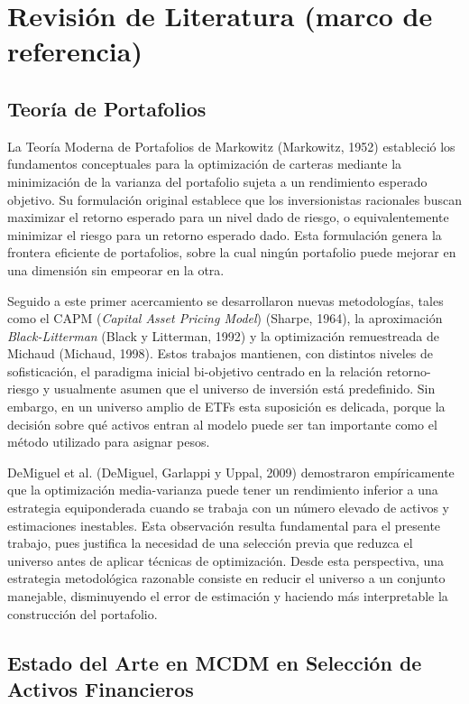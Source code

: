 \documentclass[12pt,letterpaper]{article}
\begin{document}
\clearpage
\section{Revisión de Literatura (marco de referencia)}

\subsection{Teoría de Portafolios}

La Teoría Moderna de Portafolios de Markowitz (Markowitz, 1952) estableció los fundamentos conceptuales para la optimización de carteras mediante la minimización de la varianza del portafolio sujeta a un rendimiento esperado objetivo. Su formulación original establece que los inversionistas racionales buscan maximizar el retorno esperado para un nivel dado de riesgo, o equivalentemente minimizar el riesgo para un retorno esperado dado. Esta formulación genera la frontera eficiente de portafolios, sobre la cual ningún portafolio puede mejorar en una dimensión sin empeorar en la otra.

Seguido a este primer acercamiento se desarrollaron nuevas metodologías, tales como el CAPM (\textit{Capital Asset Pricing Model}) (Sharpe, 1964), la aproximación \textit{Black-Litterman} (Black y Litterman, 1992) y la optimización remuestreada de Michaud (Michaud, 1998). Estos trabajos mantienen, con distintos niveles de sofisticación, el paradigma inicial bi-objetivo centrado en la relación retorno-riesgo y usualmente asumen que el universo de inversión está predefinido. Sin embargo, en un universo amplio de ETFs esta suposición es delicada, porque la decisión sobre qué activos entran al modelo puede ser tan importante como el método utilizado para asignar pesos.

DeMiguel et al. (DeMiguel, Garlappi y Uppal, 2009) demostraron empíricamente que la optimización media-varianza puede tener un rendimiento inferior a una estrategia equiponderada cuando se trabaja con un número elevado de activos y estimaciones inestables. Esta observación resulta fundamental para el presente trabajo, pues justifica la necesidad de una selección previa que reduzca el universo antes de aplicar técnicas de optimización. Desde esta perspectiva, una estrategia metodológica razonable consiste en reducir el universo a un conjunto manejable, disminuyendo el error de estimación y haciendo más interpretable la construcción del portafolio.

\subsection{Estado del Arte en MCDM en Selección de Activos Financieros}
\end{document}
